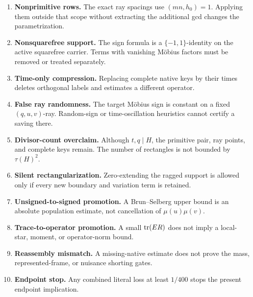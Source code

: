 \begin{enumerate}[label=\textup{(K\arabic*)},leftmargin=3.5em]
 \item \textbf{Nonprimitive rows.}  The exact ray spacings use
       \((mn,h_0)=1\).  Applying them outside that scope without extracting
       the additional gcd changes the parametrization.

 \item \textbf{Nonsquarefree support.}  The sign formula is a
       \(\{-1,1\}\)-identity on the active squarefree carrier.  Terms with
       vanishing M\"obius factors must be removed or treated separately.

 \item \textbf{Time-only compression.}  Replacing complete native keys by
       their times deletes orthogonal labels and estimates a different
       operator.

 \item \textbf{False ray randomness.}  The target M\"obius sign is constant
       on a fixed \((q,u,v)\)-ray.  Random-sign or time-oscillation
       heuristics cannot certify a saving there.

 \item \textbf{Divisor-count overclaim.}  Although \(t,q\mid H\), the
       primitive pair, ray points, and complete keys remain.  The number
       of rectangles is not bounded by \(\tau(H)^2\).

 \item \textbf{Silent rectangularization.}  Zero-extending the ragged
       support is allowed only if every new boundary and variation term is
       retained.

 \item \textbf{Unsigned-to-signed promotion.}  A Brun--Selberg upper bound
       is an absolute population estimate, not cancellation of
       \(\mu(u)\mu(v)\).

 \item \textbf{Trace-to-operator promotion.}  A small
       \(\operatorname{tr}(ER)\) does not imply a local-star, moment, or operator-norm
       bound.

 \item \textbf{Reassembly mismatch.}  A missing-native estimate does not
       prove the mass, represented-frame, or nuisance shorting gates.

 \item \textbf{Endpoint stop.}  Any combined literal loss at least
       \(1/400\) stops the present endpoint implication.
\end{enumerate}

